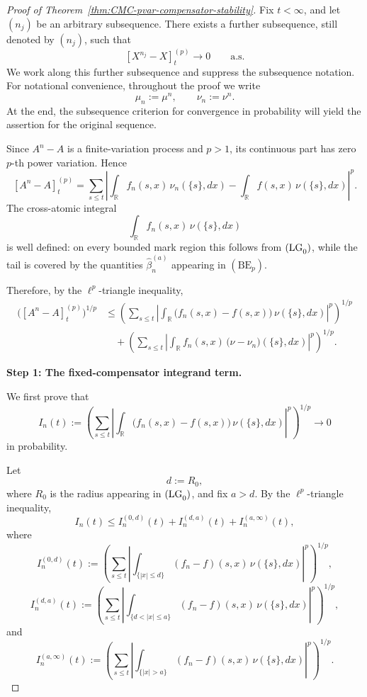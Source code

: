 \documentclass[a4paper,10pt]{article}
\begin{document}
\begin{proof}[Proof of Theorem~\ref{thm:CMC-pvar-compensator-stability}]
Fix \(t<\infty\), and let \((n_j)\) be an arbitrary subsequence.
There exists a further subsequence, still denoted by \((n_j)\), such
that
\[
        [X^{n_j}-X]^{(p)}_t
        \longrightarrow0
        \qquad\text{a.s.}
\]
We work along this further subsequence and suppress the subsequence
notation. For notational convenience, throughout the proof we write
\[
        \mu_n:=\mu^n,
        \qquad
        \nu_n:=\nu^n.
\]
At the end, the subsequence criterion for convergence in probability
will yield the assertion for the original sequence.

Since \(A^n-A\) is a finite-variation process and \(p>1\), its
continuous part has zero \(p\)-th power variation. Hence
\[
[A^n-A]^{(p)}_t
=
\sum_{s\le t}
\left|
\int_{\mathbb R}f_n(s,x)\,\nu_n(\{s\},dx)
-
\int_{\mathbb R}f(s,x)\,\nu(\{s\},dx)
\right|^p.
\]
The cross-atomic integral
\[
        \int_{\mathbb R}f_n(s,x)\,\nu(\{s\},dx)
\]
is well defined: on every bounded mark region this follows from
\({\rm (LG}_0{\rm )}\), while the tail is covered by the quantities
\(\widehat\beta_n^{(a)}\) appearing in \((\mathrm{BE}_p)\).

Therefore, by the \(\ell^p\)-triangle inequality,
\begin{align}
\bigl([A^n-A]^{(p)}_t\bigr)^{1/p}
&\le
\left(
\sum_{s\le t}
\left|
\int_{\mathbb R}
\bigl(f_n(s,x)-f(s,x)\bigr)\,
\nu(\{s\},dx)
\right|^p
\right)^{1/p}
\nonumber\\
&\quad+
\left(
\sum_{s\le t}
\left|
\int_{\mathbb R}
f_n(s,x)\,
\bigl(\nu-\nu_n\bigr)(\{s\},dx)
\right|^p
\right)^{1/p}.
\label{eq:pvar-main-split}
\end{align}

\medskip
\noindent
\textbf{Step 1: The fixed-compensator integrand term.}
\medskip

We first prove that
\[
I_n(t)
:=
\left(
\sum_{s\le t}
\left|
\int_{\mathbb R}
\bigl(f_n(s,x)-f(s,x)\bigr)\,
\nu(\{s\},dx)
\right|^p
\right)^{1/p}
\longrightarrow0
\]
in probability.

Let
\[
        d:=R_0,
\]
where \(R_0\) is the radius appearing in
\({\rm (LG}_0{\rm )}\), and fix \(a>d\). By the
\(\ell^p\)-triangle inequality,
\[
        I_n(t)
        \le
        I_n^{(0,d)}(t)
        +
        I_n^{(d,a)}(t)
        +
        I_n^{(a,\infty)}(t),
\]
where
\[
I_n^{(0,d)}(t)
:=
\left(
\sum_{s\le t}
\left|
\int_{\{|x|\le d\}}
(f_n-f)(s,x)\,\nu(\{s\},dx)
\right|^p
\right)^{1/p},
\]
\[
I_n^{(d,a)}(t)
:=
\left(
\sum_{s\le t}
\left|
\int_{\{d<|x|\le a\}}
(f_n-f)(s,x)\,\nu(\{s\},dx)
\right|^p
\right)^{1/p},
\]
and
\[
I_n^{(a,\infty)}(t)
:=
\left(
\sum_{s\le t}
\left|
\int_{\{|x|>a\}}
(f_n-f)(s,x)\,\nu(\{s\},dx)
\right|^p
\right)^{1/p}.
\]


\end{proof}
\end{document}
